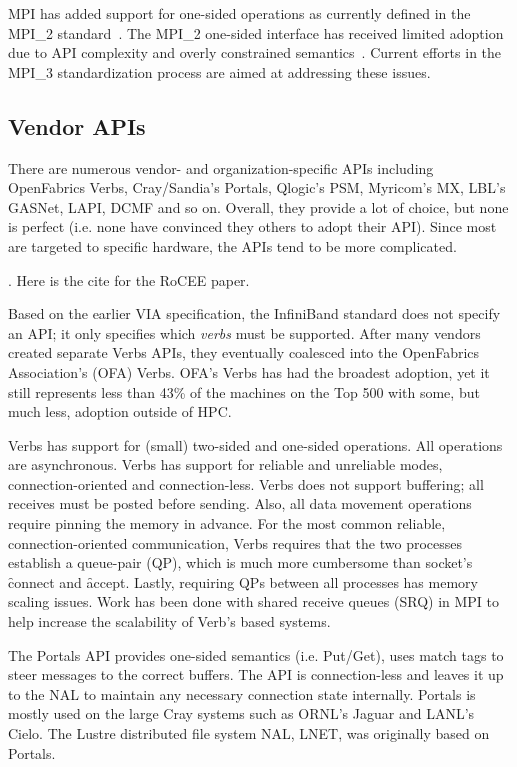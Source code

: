 MPI has added support for one-sided operations as currently defined
in the MPI\_2 standard~\cite{geist96:_mpi2_lyon}. The MPI\_2 one-sided
interface has received limited adoption due to API complexity and
overly constrained semantics~\cite{bonachea-upc-mpi2}. Current efforts
in the MPI\_3 standardization process are aimed at addressing these
issues. 


\subsection{Vendor APIs} There are numerous vendor- and
organization-specific APIs including OpenFabrics
Verbs\cite{ofa-verbs}, Cray/Sandia's Portals\cite{portals}, Qlogic's
PSM\cite{psm}, Myricom's MX\cite{mx}, LBL's GASNet\cite{gasnet},
LAPI\cite{lapi_a_1998}, DCMF\cite{Kumar:2008:DCM:1375527.1375544} and
so on.  Overall, they provide a lot of choice, but none is perfect
(i.e. none have convinced they others to adopt their API).  Since most
are targeted to specific hardware, the APIs tend to be more
complicated.

.
Here is the cite for the RoCEE paper\cite{RoCEE}.

Based on the earlier VIA specification\cite{via}, the InfiniBand standard does not specify
an API; it only specifies which \emph{verbs} must be supported. After many vendors created
separate Verbs APIs, they eventually coalesced into the OpenFabrics Association's (OFA)
Verbs. OFA's Verbs has had the broadest adoption, yet it still represents less than 43\%
of the machines on the Top 500\cite{top500} with some, but much less, adoption outside of
HPC.

Verbs has support for (small) two-sided and one-sided operations. All operations are
asynchronous. Verbs has support for reliable and unreliable modes, connection-oriented
and connection-less. Verbs does not support buffering; all receives must be posted before
sending. Also, all data movement operations require pinning the memory in advance. For the
most common reliable, connection-oriented communication, Verbs requires that the two
processes establish a queue-pair (QP), which is much more cumbersome than socket's
\f{connect} and \f{accept}. Lastly, requiring QPs between all processes has memory scaling
issues. Work has been done with shared receive queues (SRQ) in MPI\cite{srq} to help
increase the scalability of Verb's based systems.

The Portals API provides one-sided semantics (i.e.  Put/Get), uses match tags to steer
messages to the correct buffers. The API is connection-less and leaves it up to the NAL to
maintain any necessary connection state internally. Portals is mostly used on the large
Cray systems such as ORNL's Jaguar\cite{jaguar_cug_2010} and LANL's Cielo\cite{cielo}.  The
Lustre distributed file system NAL, LNET, was originally based on Portals\cite{lnet}.

